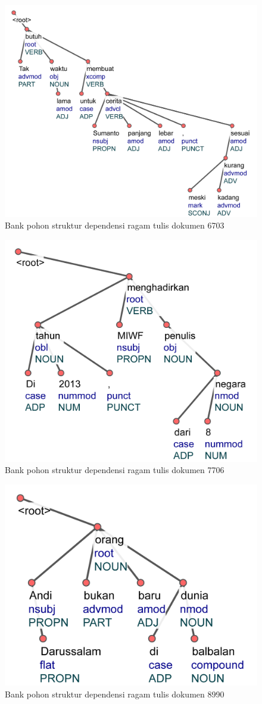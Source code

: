 \begin{figure}
	\centering \includegraphics[width=0.7
	\textwidth] {pics/lampiran/lampirants6703.jpg} 
	\caption[]{Bank pohon struktur dependensi ragam tulis dokumen 6703} 
	\label{fig:lampirants6703} 
\end{figure}

\begin{figure}
	\centering \includegraphics[width=0.45
	\textwidth] {pics/lampiran/lampirants7706.jpg} 
	\caption[]{Bank pohon struktur dependensi ragam tulis dokumen 7706} 
	\label{fig:lampirants7706} 
\end{figure}


\begin{figure}
	\centering \includegraphics[width=0.4
	\textwidth] {pics/lampiran/lampirants8990.jpg} 
	\caption[]{Bank pohon struktur dependensi ragam tulis dokumen 8990} 
	\label{fig:lampirants8990} 
\end{figure}

